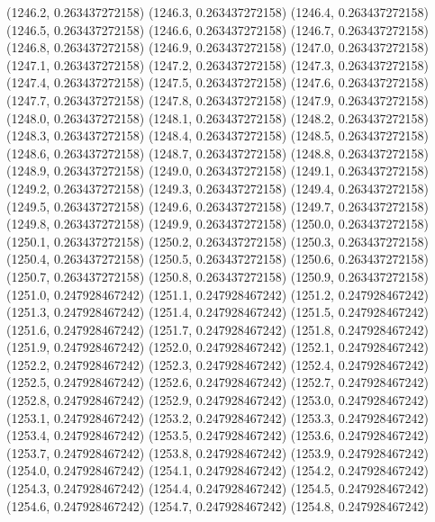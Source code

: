 {					(1246.2, 0.263437272158)
					(1246.3, 0.263437272158)
					(1246.4, 0.263437272158)
					(1246.5, 0.263437272158)
					(1246.6, 0.263437272158)
					(1246.7, 0.263437272158)
					(1246.8, 0.263437272158)
					(1246.9, 0.263437272158)
					(1247.0, 0.263437272158)
					(1247.1, 0.263437272158)
					(1247.2, 0.263437272158)
					(1247.3, 0.263437272158)
					(1247.4, 0.263437272158)
					(1247.5, 0.263437272158)
					(1247.6, 0.263437272158)
					(1247.7, 0.263437272158)
					(1247.8, 0.263437272158)
					(1247.9, 0.263437272158)
					(1248.0, 0.263437272158)
					(1248.1, 0.263437272158)
					(1248.2, 0.263437272158)
					(1248.3, 0.263437272158)
					(1248.4, 0.263437272158)
					(1248.5, 0.263437272158)
					(1248.6, 0.263437272158)
					(1248.7, 0.263437272158)
					(1248.8, 0.263437272158)
					(1248.9, 0.263437272158)
					(1249.0, 0.263437272158)
					(1249.1, 0.263437272158)
					(1249.2, 0.263437272158)
					(1249.3, 0.263437272158)
					(1249.4, 0.263437272158)
					(1249.5, 0.263437272158)
					(1249.6, 0.263437272158)
					(1249.7, 0.263437272158)
					(1249.8, 0.263437272158)
					(1249.9, 0.263437272158)
					(1250.0, 0.263437272158)
					(1250.1, 0.263437272158)
					(1250.2, 0.263437272158)
					(1250.3, 0.263437272158)
					(1250.4, 0.263437272158)
					(1250.5, 0.263437272158)
					(1250.6, 0.263437272158)
					(1250.7, 0.263437272158)
					(1250.8, 0.263437272158)
					(1250.9, 0.263437272158)
					(1251.0, 0.247928467242)
					(1251.1, 0.247928467242)
					(1251.2, 0.247928467242)
					(1251.3, 0.247928467242)
					(1251.4, 0.247928467242)
					(1251.5, 0.247928467242)
					(1251.6, 0.247928467242)
					(1251.7, 0.247928467242)
					(1251.8, 0.247928467242)
					(1251.9, 0.247928467242)
					(1252.0, 0.247928467242)
					(1252.1, 0.247928467242)
					(1252.2, 0.247928467242)
					(1252.3, 0.247928467242)
					(1252.4, 0.247928467242)
					(1252.5, 0.247928467242)
					(1252.6, 0.247928467242)
					(1252.7, 0.247928467242)
					(1252.8, 0.247928467242)
					(1252.9, 0.247928467242)
					(1253.0, 0.247928467242)
					(1253.1, 0.247928467242)
					(1253.2, 0.247928467242)
					(1253.3, 0.247928467242)
					(1253.4, 0.247928467242)
					(1253.5, 0.247928467242)
					(1253.6, 0.247928467242)
					(1253.7, 0.247928467242)
					(1253.8, 0.247928467242)
					(1253.9, 0.247928467242)
					(1254.0, 0.247928467242)
					(1254.1, 0.247928467242)
					(1254.2, 0.247928467242)
					(1254.3, 0.247928467242)
					(1254.4, 0.247928467242)
					(1254.5, 0.247928467242)
					(1254.6, 0.247928467242)
					(1254.7, 0.247928467242)
					(1254.8, 0.247928467242)
}

